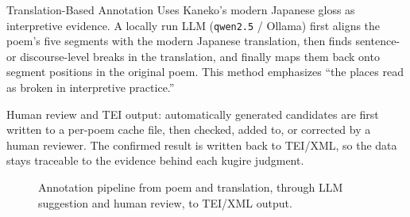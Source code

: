 \begin{block}{Translation-Based Annotation}
Uses Kaneko's modern Japanese gloss as interpretive evidence. A locally run LLM
(\texttt{qwen2.5} / Ollama) first aligns the poem's five segments with the modern
Japanese translation, then finds sentence- or discourse-level breaks in the
translation, and finally maps them back onto segment positions in the original
poem. This method emphasizes ``the places read as broken in interpretive
practice.''

Human review and TEI output: automatically generated candidates are first
written to a per-poem cache file, then checked, added to, or corrected by a
human reviewer. The confirmed result is written back to TEI/XML, so the data
stays traceable to the evidence behind each kugire judgment.

\begin{figure}[H]\centering

\setcounter{figure}{5}
\caption{Annotation pipeline from poem and translation, through LLM
suggestion and human review, to TEI/XML output.}
\end{figure}
\end{block}
